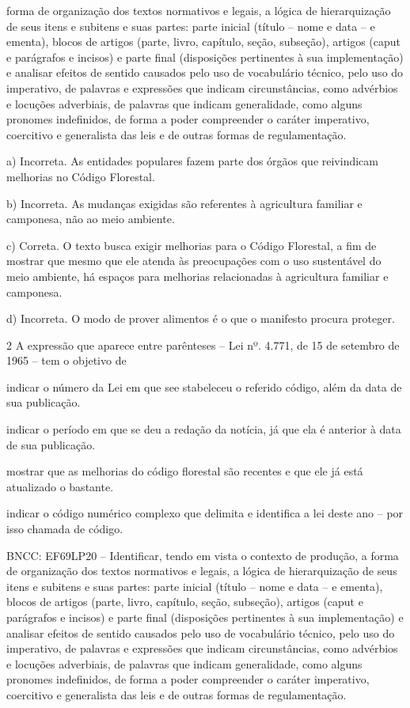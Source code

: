 forma de organização dos textos normativos e legais, a lógica de
hierarquização de seus itens e subitens e suas partes: parte inicial
(título -- nome e data -- e ementa), blocos de artigos (parte, livro,
capítulo, seção, subseção), artigos (caput e parágrafos e incisos) e
parte final (disposições pertinentes à sua implementação) e analisar
efeitos de sentido causados pelo uso de vocabulário técnico, pelo uso do
imperativo, de palavras e expressões que indicam circunstâncias, como
advérbios e locuções adverbiais, de palavras que indicam generalidade,
como alguns pronomes indefinidos, de forma a poder compreender o caráter
imperativo, coercitivo e generalista das leis e de outras formas de
regulamentação.

a) Incorreta. As entidades populares fazem parte dos órgãos que
reivindicam melhorias no Código Florestal.

b) Incorreta. As mudanças exigidas são referentes à agricultura familiar
e camponesa, não ao meio ambiente.

c) Correta. O texto busca exigir melhorias para o Código Florestal, a
fim de mostrar que mesmo que ele atenda às preocupações com o uso
sustentável do meio ambiente, há espaços para melhorias relacionadas à
agricultura familiar e camponesa.

d) Incorreta. O modo de prover alimentos é o que o manifesto procura
proteger.

\num{2} A expressão que aparece entre parênteses -- Lei nº. 4.771, de 15
de setembro de 1965 -- tem o objetivo de

\begin{escolha}
\item indicar o número da Lei em que see stabeleceu o referido código,
além da data de sua publicação.

\item indicar o período em que se deu a redação da notícia, já que ela é
anterior à data de sua publicação.

\item mostrar que as melhorias do código florestal são recentes e que ele
já está atualizado o bastante.

\item indicar o código numérico complexo que delimita e identifica a lei
deste ano -- por isso chamada de código.
\end{escolha}

BNCC: EF69LP20 -- Identificar, tendo em vista o contexto de produção, a
forma de organização dos textos normativos e legais, a lógica de
hierarquização de seus itens e subitens e suas partes: parte inicial
(título -- nome e data -- e ementa), blocos de artigos (parte, livro,
capítulo, seção, subseção), artigos (caput e parágrafos e incisos) e
parte final (disposições pertinentes à sua implementação) e analisar
efeitos de sentido causados pelo uso de vocabulário técnico, pelo uso do
imperativo, de palavras e expressões que indicam circunstâncias, como
advérbios e locuções adverbiais, de palavras que indicam generalidade,
como alguns pronomes indefinidos, de forma a poder compreender o caráter
imperativo, coercitivo e generalista das leis e de outras formas de
regulamentação.

